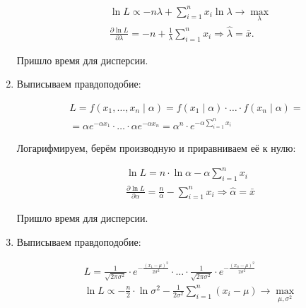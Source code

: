 \documentclass[12pt, a4paper, oneside]{extreport}
\theoremstyle{plain}              %
\theoremstyle{definition}         %
\begin{document}
\begin{sol}
\begin{enumerate}
\begin{equation*}
\begin{aligned}
& \ln L \propto -n \lambda + \sum_{i=1}^n x_i \ln \lambda \to \max_{\lambda} \\ 
& \frac{\partial \ln L}{\partial \lambda} = -n + \frac{1}{\lambda} \sum_{i=1}^n x_i  \Rightarrow \hat \lambda = \bar x.
\end{aligned}
\end{equation*}
	
Пришло время для дисперсии. 


\item Выписываем правдоподобие: 
	
	
	\begin{multline*}
	L = f(x_1, \ldots, x_n \mid \alpha) = f(x_1 \mid \alpha) \cdot \ldots \cdot f(x_n \mid \alpha) = \\ = \alpha e^{- \alpha x_1} \cdot \ldots \cdot \alpha e^{-\alpha x_n} = \alpha^n \cdot e^{-\alpha \sum_{i=1}^n x_i}
	\end{multline*}
	
	Логарифмируем, берём производную и приравниваем её к нулю:
	
	\begin{equation*}
	\begin{aligned}
	& \ln L =   n \cdot \ln \alpha - \alpha \sum_{i=1}^n x_i\\ 
	& \frac{\partial \ln L}{\partial \alpha} = \frac{n}{\alpha} - \sum_{i=1}^n x_i \Rightarrow \hat \alpha = \bar x 
	\end{aligned}
	\end{equation*}
	
	Пришло время для дисперсии. 
	


\item Выписываем правдоподобие: 

\begin{equation*}
\begin{aligned}
& L = \frac{1}{\sqrt{2 \pi \sigma^2}} \cdot e^{-\frac{(x_1 - \mu)^2}{2 \sigma^2}} \cdot \ldots \cdot \frac{1}{\sqrt{2 \pi \sigma^2}} \cdot e^{-\frac{(x_n - \mu)^2}{2 \sigma^2}} \\ 
& \ln L \propto - \frac{n}{2} \cdot \ln \sigma^2 - \frac{1}{2 \sigma^2} \sum_{i=1}^n (x_i - \mu) \to \max_{\mu, \sigma^2}		
\end{aligned}
\end{equation*}


		
\end{enumerate}	
\end{sol}
\end{document}

